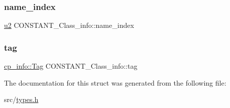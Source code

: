 \subsubsection{\texorpdfstring{name\+\_\+index}{name\_index}}
{\footnotesize\ttfamily \hyperlink{types_8h_ae676e9207f57fb921dca7366b2f59c53}{u2} C\+O\+N\+S\+T\+A\+N\+T\+\_\+\+Class\+\_\+info\+::name\+\_\+index}

\mbox{\label{structCONSTANT__Class__info_aeb3e30f283579d0958ab77e115ce70af}} 
\subsubsection{\texorpdfstring{tag}{tag}}
{\footnotesize\ttfamily \hyperlink{structcp__info_acdef8472ed83e12e3a87bca8d6001f69}{cp\+\_\+info\+::\+Tag} C\+O\+N\+S\+T\+A\+N\+T\+\_\+\+Class\+\_\+info\+::tag}



The documentation for this struct was generated from the following file\+:\begin{DoxyCompactItemize}
\item 
src/\hyperlink{types_8h}{types.\+h}\end{DoxyCompactItemize}
